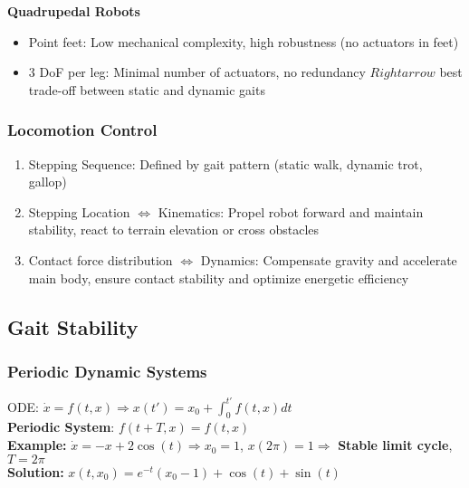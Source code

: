 \documentclass[fontsize=6pt]{scrartcl}
\renewcommand{\exp}[1]{e^{#1}}
\begin{document}
\begin{multicols*}{4}
\textbf{Quadrupedal Robots}
\begin{itemize}
	\item Point feet: Low mechanical complexity, high robustness (no actuators in feet)
	\item 3 DoF per leg: Minimal number of actuators, no redundancy $Rightarrow$ best trade-off
		  between static and dynamic gaits
\end{itemize}

\subsubsection*{Locomotion Control}
\begin{enumerate}
	\item Stepping Sequence: Defined by gait pattern (static walk, dynamic trot, gallop)
	\item Stepping Location $\Leftrightarrow$ Kinematics: Propel robot forward and maintain stability,
		  react to terrain elevation or cross obstacles
	\item Contact force distribution $\Leftrightarrow$ Dynamics: Compensate gravity
		  and accelerate main body, ensure contact stability and optimize energetic efficiency
\end{enumerate}

\subsection*{Gait Stability}
\subsubsection*{Periodic Dynamic Systems}
ODE: $\dot{x} = f(t,x) \Rightarrow x(t') = x_0 + \int_0^{t'}f(t,x)dt$\\
\textbf{Periodic System}: $f(t+T, x)=f(t,x)$\\
\textbf{Example:} $\dot{x} = -x + 2\cos(t) \Rightarrow x_0 = 1$, $x(2\pi) = 1\Rightarrow$
\textbf{Stable limit cycle}, $T=2\pi$\\
\textbf{Solution:} $x(t,x_0)=\exp{-t}(x_0-1)+\cos(t)+\sin(t)$


\end{multicols*}
\end{document}
